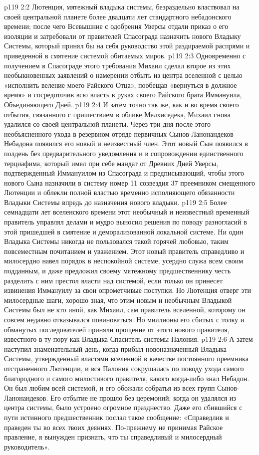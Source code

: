 \vs p119 2:2 Лютенция, мятежный владыка системы, безраздельно властвовал на своей центральной планете более двадцати лет стандартного небадонского времени; после чего Всевышние с одобрения Уверсы отдали приказ о его изоляции и затребовали от правителей Спасограда назначить нового Владыку Системы, который принял бы на себя руководство этой раздираемой распрями и приведенной в смятение системой обитаемых миров.
\vs p119 2:3 \pc Одновременно с получением в Спасограде этого требования Михаил сделал второе из этих необыкновенных заявлений о намерении отбыть из центра вселенной с целью «исполнить веление моего Райского Отца», пообещав «вернуться в должное время» и сосредоточив всю власть в руках своего Райского брата Иммануила, Объединяющего Дней.
\vs p119 2:4 И затем точно так же, как и во время своего отбытия, связанного с пришествием в облике Мелхиседека, Михаил снова удалился со своей центральной планеты. Через три дня после этого необъясненного ухода в резервном отряде первичных Сынов\hyp{}Ланонандеков Небадона появился его новый и неизвестный член. Этот новый Сын появился в полдень без предварительного уведомления и в сопровождении единственного терциафима, который имел при себе мандат от Древних Дней Уверсы, подтвержденный Иммануилом из Спасограда и предписывающий, чтобы этого нового Сына назначили в систему номер 11 созвездия 37 преемником смещенного Лютенции и облекли полной властью временно исполняющего обязанности Владыки Системы впредь до назначения нового владыки.
\vs p119 2:5 Более семнадцати лет вселенского времени этот необычный и неизвестный временный правитель управлял делами и мудро выносил решения по поводу разногласий в этой пришедшей в смятение и деморализованной локальной системе. Ни один Владыка Системы никогда не пользовался такой горячей любовью, таким повсеместным почитанием и уважением. Этот новый правитель справедливо и милосердно навел порядок в неспокойной системе, усердно служа всем своим подданным, и даже предложил своему мятежному предшественнику честь разделить с ним престол власти над системой, если только он принесет извинения Иммануилу за свои опрометчивые поступки. Но Лютенция отверг эти милосердные шаги, хорошо зная, что этим новым и необычным Владыкой Системы был не кто иной, как Михаил, сам правитель вселенной, которому он совсем недавно отказывался повиноваться. Но миллионы его сбитых с толку и обманутых последователей приняли прощение от этого нового правителя, известного в ту пору как Владыка\hyp{}Спаситель системы Палония.
\vs p119 2:6 \pc А затем наступил знаменательный день, когда прибыл новоназначенный Владыка Системы, утвержденный властями вселенной в качестве постоянного преемника отстраненного Лютенции, и вся Палония сокрушалась по поводу ухода самого благородного и самого милостивого правителя, какого когда\hyp{}либо знал Небадон. Он был любим всей системой, и его обожали собратья из всех групп Сынов\hyp{}Ланонандеков. Его отбытие не прошло без церемоний; когда он удалялся из центра системы, было устроено огромное празднество. Даже его сбившийся с пути истинного предшественник послал такое сообщение: «Справедлив и праведен ты во всех твоих деяниях. По\hyp{}прежнему не принимая Райское правление, я вынужден признать, что ты справедливый и милосердный руководитель».
